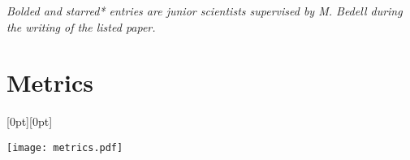 \documentclass{clean_cv}
\begin{document}
\textit{Bolded and starred* entries are junior scientists supervised by M. Bedell during the writing of the listed paper.}
\vspace{2mm}

\begin{itemize}
    
\end{itemize}

\section{Metrics}
\vspace{-4mm}

\begin{center}
    \raisebox{-0.9\height}[0pt][0pt]{

        \texttt{[image: metrics.pdf]}
    }
\end{center}
\end{document}
